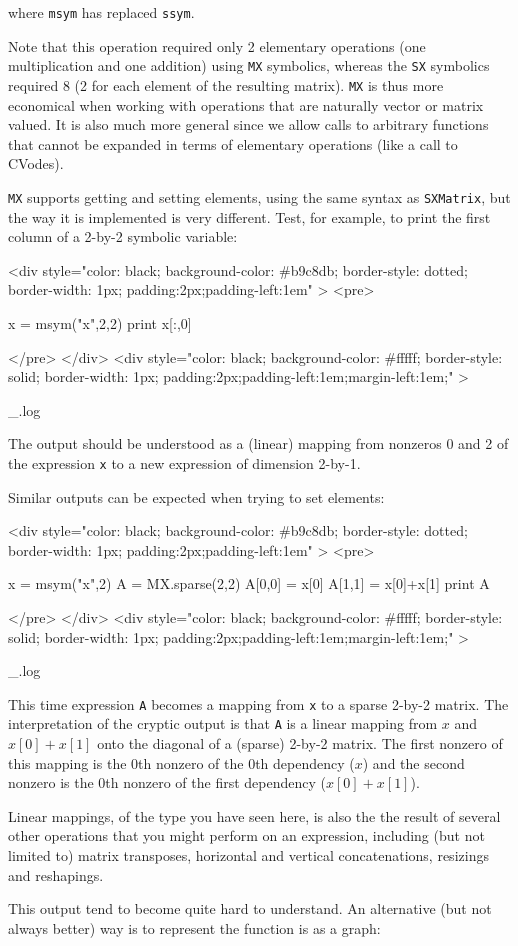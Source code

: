 \documentclass[a4paper,12pt]{book}
\newcounter{pytexcount}
\newcounter{pytexsubcount}
\renewenvironment{pytex}
{\addtocounter{pytexsubcount}{1}%
\begin{rawhtml}
<div style="color: black; background-color: \#b9c8db;  border-style: dotted; border-width: 1px; padding:2px;padding-left:1em" >
<pre>
\end{rawhtml}
}%
{\begin{rawhtml}
</pre>
</div>
<div style="color: black; background-color: \#fffff;  border-style: solid; border-width: 1px; padding:2px;padding-left:1em;margin-left:1em;" >\end{rawhtml}
_\arabic{pytexsubcount}.log}%
\begin{rawhtml}
</div>
\end{rawhtml}
}
\begin{document}
{where \texttt{msym} has replaced \texttt{ssym}.

Note that this operation required only 2 elementary operations (one multiplication and one addition) using \texttt{MX} symbolics, whereas the \texttt{SX} symbolics required 8 (2 for each element of the resulting matrix). \texttt{MX} is thus more economical when working with operations that are naturally vector or matrix valued. It is also much more general since we allow calls to arbitrary functions that cannot be expanded in terms of elementary operations (like a call to CVodes). %

\texttt{MX} supports getting and setting elements, using the same syntax as \texttt{SXMatrix}, but the way it is implemented is very different. Test, for example, to print the first column of a 2-by-2 symbolic variable:
\begin{pytex}
x = msym("x",2,2)
print x[:,0] 
\end{pytex}

The output should be understood as a (linear) mapping from nonzeros 0 and 2 of the expression \texttt{x} to a new expression of dimension 2-by-1.

Similar outputs can be expected when trying to set elements:
\begin{pytex}
x = msym("x",2)
A = MX.sparse(2,2)
A[0,0] = x[0]
A[1,1] = x[0]+x[1]
print A
\end{pytex}

This time expression \texttt{A} becomes a mapping from \texttt{x} to a sparse 2-by-2 matrix. The interpretation of the cryptic output is that \texttt{A} is a linear mapping from $x$ and $x[0]+x[1]$ onto the diagonal of a (sparse) 2-by-2 matrix. The first nonzero of this mapping is the 0th nonzero of the 0th dependency ($x$) and the second nonzero is the 0th nonzero of the first dependency ($x[0]+x[1]$). 

Linear mappings, of the type you have seen here, is also the the result of several other operations that you might perform on an expression, including (but not limited to) matrix transposes, horizontal and vertical concatenations, resizings and reshapings.

This output tend to become quite hard to understand. An alternative (but not always better) way is to represent the function is as a graph:

}
\end{document}
